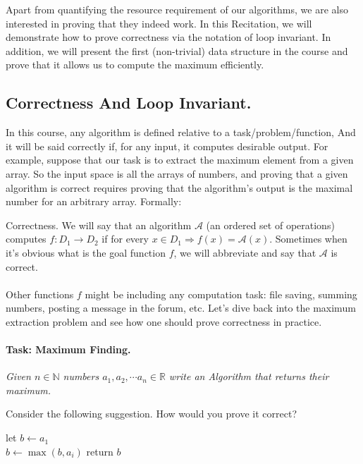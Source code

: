   Apart from quantifying the resource requirement of our algorithms, we are also interested in proving that they indeed work. In this Recitation, we will demonstrate how to prove correctness via the notation of loop invariant. In addition, we will present the first (non-trivial) data structure in the course and prove that it allows us to compute the maximum efficiently.



\subsection*{Correctness And Loop Invariant.}
In this course, any algorithm is defined relative to a task/problem/function, And it will be said correctly if, for any input, it computes desirable output. For example, suppose that our task is to extract the maximum element from a given array. 
So the input space is all the arrays of numbers, and proving that a given algorithm is correct requires proving that the algorithm's output is the maximal number for an arbitrary array. Formally:  
\begin{defbox}{Correctness.}
We will say that an algorithm \( \mathcal{A}\) (an ordered set of operations) computes \( f:D_1 \rightarrow D_2 \) if for every \(x \in D_1 \Rightarrow f(x) = \mathcal{A}(x)\). Sometimes when it's obvious what is the goal function \(f\), we will abbreviate and say that \( \mathcal{A}\) is correct.       
\end{defbox}
\paragraph{}
Other functions \(f\) might be including any computation task: file saving, summing numbers, posting a message in the forum, etc. Let's dive back into the maximum extraction problem and see how one should prove correctness in practice.     
\paragraph{Task: Maximum Finding.} \textit{Given $n\in \mathbb{N}$ numbers $a_1, a_2, \cdots a_n \in \mathbb{R}$ write an Algorithm that returns their maximum.} 

Consider the following suggestion. How would you prove it correct?  

\begin{algorithm*}[H]
 let \(b \leftarrow a_1 \) \\ 
  { 
        \(b \leftarrow \max \left(b, a_i \right) \)
    } 
 return \( b \) 
\end{algorithm*}

